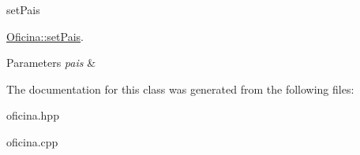 set\+Pais 

\hyperlink{classOficina_a69be721387f2b3b97b0c6a6326d046e5}{Oficina\+::set\+Pais}.


\begin{DoxyParams}{Parameters}
{\em pais} & \\
\hline
\end{DoxyParams}


The documentation for this class was generated from the following files\+:\begin{DoxyCompactItemize}
\item 
oficina.\+hpp\item 
oficina.\+cpp\end{DoxyCompactItemize}
